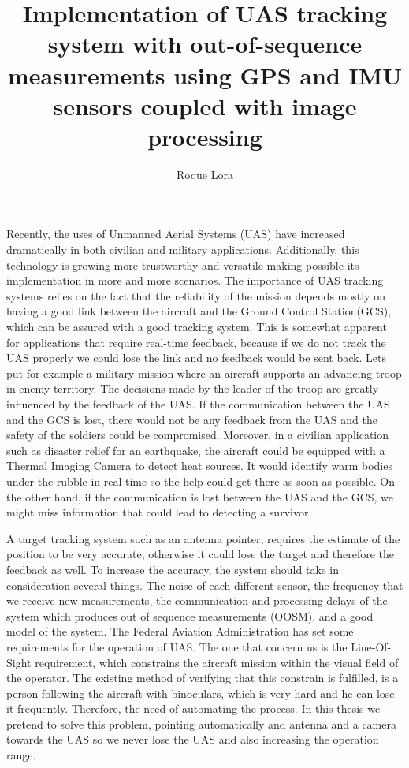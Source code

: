 \documentclass[ee,msthesis,proposal]{usuthesis}
\author{Roque Lora}
\title{Implementation of UAS tracking system with out-of-sequence measurements using GPS and IMU sensors coupled with image processing}
\begin{document}
	\preliminaries   %
    \maketitle

Recently, the uses of Unmanned Aerial Systems (UAS) have increased dramatically in both civilian and military applications. Additionally, this technology is growing more trustworthy and versatile making possible its implementation in more and more scenarios. The importance of UAS tracking systems relies on the fact that the reliability of the mission depends mostly on having a good link between the aircraft and the Ground Control Station(GCS), which can be assured with a good tracking system. This is somewhat apparent for applications that require real-time feedback, because if we do not track the UAS properly we could lose the link and no feedback would be sent back. Lets put for example a military mission where an aircraft supports an advancing troop in enemy territory.  The decisions made by the leader of the troop are greatly influenced by the feedback of the UAS. If the communication between the UAS and the GCS is lost, there would not be any feedback from the UAS and the safety of the soldiers could be compromised. Moreover, in a civilian application such as disaster relief for an earthquake, the aircraft could be equipped with a Thermal Imaging Camera to detect heat sources. It would identify warm bodies under the rubble in real time so the help could get there as soon as possible. On the other hand, if the communication is lost between the UAS and the GCS, we might miss information that could lead to detecting a survivor.

A target tracking system such as an antenna pointer, requires the estimate of the position to be very accurate, otherwise it could lose the target and therefore the feedback as well. To increase the accuracy, the system should take in consideration several things.  The noise of each different sensor, the frequency that we receive new measurements, the communication and processing delays of the system which produces out of sequence measurements (OOSM), and a good model of the system. The Federal Aviation Administration has set some requirements for the operation of UAS. The one that concern us is the Line-Of-Sight requirement, which constrains the aircraft mission within the visual field of the operator. The existing method of verifying that this constrain is fulfilled, is a person following the aircraft with binoculars, which is very hard and he can lose it frequently. Therefore, the need of automating the process. In this thesis we pretend to solve this problem, pointing automatically and antenna and a camera towards the UAS so we never lose the UAS and also increasing the operation range.
\end{document}
